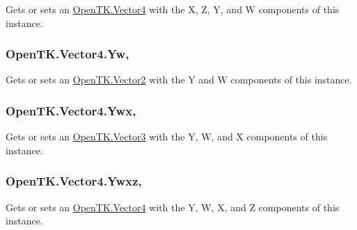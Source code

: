 Gets or sets an \hyperlink{struct_open_t_k_1_1_vector4}{Open\-T\-K.\-Vector4} with the X, Z, Y, and W components of this instance. 

\hypertarget{struct_open_t_k_1_1_vector4_a93fb0f3aa1e997e2ac52ecd9117fb78f}{
\subsubsection[{Yw}]{ Open\-T\-K.\-Vector4.\-Yw\hspace{0.3cm}{\ttfamily [get]}, {\ttfamily [set]}}}\label{struct_open_t_k_1_1_vector4_a93fb0f3aa1e997e2ac52ecd9117fb78f}


Gets or sets an \hyperlink{struct_open_t_k_1_1_vector2}{Open\-T\-K.\-Vector2} with the Y and W components of this instance. 

\hypertarget{struct_open_t_k_1_1_vector4_a6105915c93f198ff7bfd42f30bd9c535}{
\subsubsection[{Ywx}]{ Open\-T\-K.\-Vector4.\-Ywx\hspace{0.3cm}{\ttfamily [get]}, {\ttfamily [set]}}}\label{struct_open_t_k_1_1_vector4_a6105915c93f198ff7bfd42f30bd9c535}


Gets or sets an \hyperlink{struct_open_t_k_1_1_vector3}{Open\-T\-K.\-Vector3} with the Y, W, and X components of this instance. 

\hypertarget{struct_open_t_k_1_1_vector4_a41c594a8f8c007dd321a0240c185b14d}{
\subsubsection[{Ywxz}]{ Open\-T\-K.\-Vector4.\-Ywxz\hspace{0.3cm}{\ttfamily [get]}, {\ttfamily [set]}}}\label{struct_open_t_k_1_1_vector4_a41c594a8f8c007dd321a0240c185b14d}


Gets or sets an \hyperlink{struct_open_t_k_1_1_vector4}{Open\-T\-K.\-Vector4} with the Y, W, X, and Z components of this instance. 

